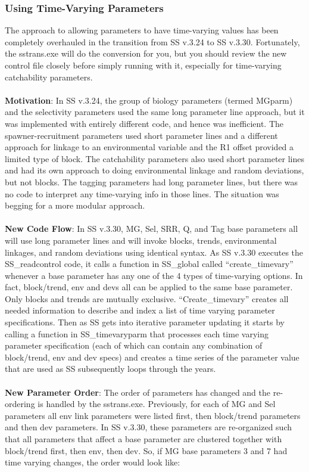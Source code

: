 \hypertarget{TVpara}{}
\subsubsection{Using Time-Varying Parameters}
 The approach to allowing parameters to have time-varying values has been completely overhauled in the transition from SS v.3.24 to SS v.3.30.  Fortunately, the sstrans.exe will do the conversion for you, but you should review the new control file closely before simply running with it, especially for time-varying catchability parameters.
 \\\\
 \noindent \textbf{Motivation}:  In SS v.3.24, the group of biology parameters (termed MGparm) and the selectivity parameters used the same long parameter line approach, but it was implemented with entirely different code, and hence was inefficient.  The spawner-recruitment parameters used short parameter lines and a different approach for linkage to an environmental variable and the R1 offset provided a limited type of block.  The catchability parameters also used short parameter lines and had its own approach to doing environmental linkage and random deviations, but not blocks.  The tagging parameters had long parameter lines, but there was no code to interpret any time-varying info in those lines.  The situation was begging for a more modular approach.
 \\\\
 \noindent \textbf{New Code Flow}:  In SS v.3.30, MG, Sel, SRR, Q, and Tag base parameters all will use long parameter lines and will invoke blocks, trends, environmental linkages, and random deviations using identical syntax.   As SS v.3.30 executes the SS\_readcontrol code, it calls a function in SS\_global called “create\_timevary” whenever a base parameter has any one of the 4 types of time-varying options.  In fact, block/trend, env and devs all can be applied to the same base parameter.  Only blocks and trends are mutually exclusive.  “Create\_timevary” creates all needed information to describe and index a list of time varying parameter specifications.  Then as SS gets into iterative parameter updating it starts by calling a function in SS\_timevaryparm that processes each time varying parameter specification (each of which can contain any combination of block/trend, env and dev specs) and creates a time series of the parameter value that are used as SS subsequently loops through the years.
 \\\\
 \noindent \textbf{New Parameter Order}: The order of parameters has changed and the re-ordering is handled by the sstrans.exe.  Previously, for each of MG and Sel parameters all env link parameters were listed first, then block/trend parameters and then dev parameters.  In SS v.3.30, these parameters are re-organized such that all parameters that affect a base parameter are clustered together with block/trend first, then env, then dev.  So, if MG base parameters 3 and 7 had time varying changes, the order would look like:
 
